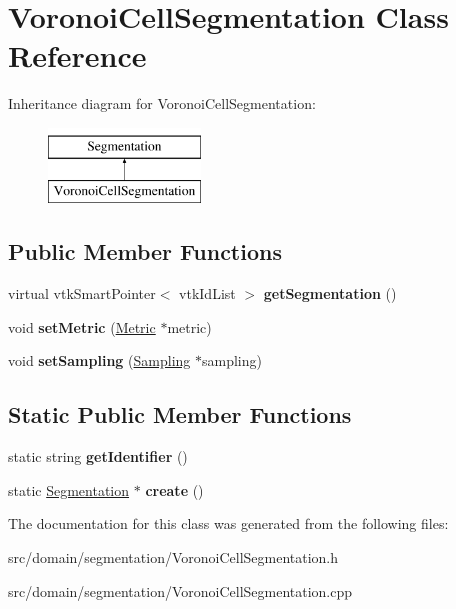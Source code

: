 \hypertarget{class_voronoi_cell_segmentation}{}\section{Voronoi\+Cell\+Segmentation Class Reference}
\label{class_voronoi_cell_segmentation}
Inheritance diagram for Voronoi\+Cell\+Segmentation\+:\begin{figure}[H]
\begin{center}
\leavevmode
\includegraphics[height=2.000000cm]{class_voronoi_cell_segmentation}
\end{center}
\end{figure}
\subsection*{Public Member Functions}
\begin{DoxyCompactItemize}
\item 
\hypertarget{class_voronoi_cell_segmentation_a1d251f1dd4866ce7dbb9089211f84cae}{}virtual vtk\+Smart\+Pointer$<$ vtk\+Id\+List $>$ {\bfseries get\+Segmentation} ()\label{class_voronoi_cell_segmentation_a1d251f1dd4866ce7dbb9089211f84cae}

\item 
\hypertarget{class_voronoi_cell_segmentation_ab8cb306df71814d856a31adad60ba52a}{}void {\bfseries set\+Metric} (\hyperlink{class_metric}{Metric} $\ast$metric)\label{class_voronoi_cell_segmentation_ab8cb306df71814d856a31adad60ba52a}

\item 
\hypertarget{class_voronoi_cell_segmentation_afbf5680740afcc75d685b277e81edcfd}{}void {\bfseries set\+Sampling} (\hyperlink{class_sampling}{Sampling} $\ast$sampling)\label{class_voronoi_cell_segmentation_afbf5680740afcc75d685b277e81edcfd}

\end{DoxyCompactItemize}
\subsection*{Static Public Member Functions}
\begin{DoxyCompactItemize}
\item 
\hypertarget{class_voronoi_cell_segmentation_a5437aff9397f5d17be2bcd4592ea5a57}{}static string {\bfseries get\+Identifier} ()\label{class_voronoi_cell_segmentation_a5437aff9397f5d17be2bcd4592ea5a57}

\item 
\hypertarget{class_voronoi_cell_segmentation_a6ec81d90fed80c6d187da23c98a9fe70}{}static \hyperlink{class_segmentation}{Segmentation} $\ast$ {\bfseries create} ()\label{class_voronoi_cell_segmentation_a6ec81d90fed80c6d187da23c98a9fe70}

\end{DoxyCompactItemize}


The documentation for this class was generated from the following files\+:\begin{DoxyCompactItemize}
\item 
src/domain/segmentation/Voronoi\+Cell\+Segmentation.\+h\item 
src/domain/segmentation/Voronoi\+Cell\+Segmentation.\+cpp\end{DoxyCompactItemize}
